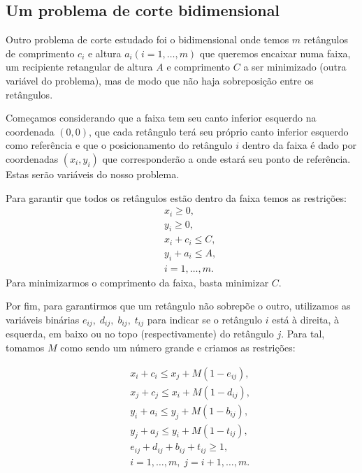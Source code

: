 \documentclass{article}
\begin{document}
\subsection{Um problema de corte bidimensional}

Outro problema de corte estudado foi o bidimensional onde temos $m$ retângulos de comprimento $c_i$ e altura $a_i (i=1, \dots, m)$ que queremos encaixar numa faixa, um recipiente retangular de altura $A$ e comprimento $C$ a ser minimizado (outra variável do problema), mas de modo que não haja sobreposição entre os retângulos.

Começamos considerando que a faixa tem seu canto inferior esquerdo na coordenada $(0,0)$, que cada retângulo terá seu próprio canto inferior esquerdo como referência e que o posicionamento do retângulo $i$ dentro da faixa é dado por coordenadas $(x_i, y_i)$ que corresponderão a onde estará seu ponto de referência. Estas serão variáveis do nosso problema.

Para garantir que todos os retângulos estão dentro da faixa temos as restrições:
\begin{equation*}
    \begin{aligned}
        \quad & x_i \geq 0, \\
        & y_i \geq 0, \\
        & x_i + c_i \leq C, \\
        & y_i + a_i \leq A, \\
        & i = 1, \dots, m.
    \end{aligned}
\end{equation*}
Para minimizarmos o comprimento da faixa, basta minimizar $C$.

Por fim, para garantirmos que um retângulo não sobrepõe o outro, utilizamos as variáveis binárias $e_{ij},\; d_{ij}, \; b_{ij}, \;t_{ij}$ para indicar se o retângulo $i$ está à direita, à esquerda, em baixo ou no topo (respectivamente) do retângulo $j$. Para tal, tomamos $M$ como sendo um número grande e criamos as restrições:

\begin{equation*}
    \begin{aligned}
        \quad & x_i + c_i \leq x_j + M(1-e_{ij}),\\
        & x_j + c_j \leq x_i + M(1-d_{ij}),\\
        & y_i + a_i \leq y_j + M(1-b_{ij}),\\
        & y_j + a_j \leq y_i + M(1-t_{ij}),\\
        & e_{ij} + d_{ij} + b_{ij} + t_{ij} \geq 1,\\
        & i = 1, \dots, m, \; j = i+1, \dots, m.
    \end{aligned}
\end{equation*}
\;
\end{document}
